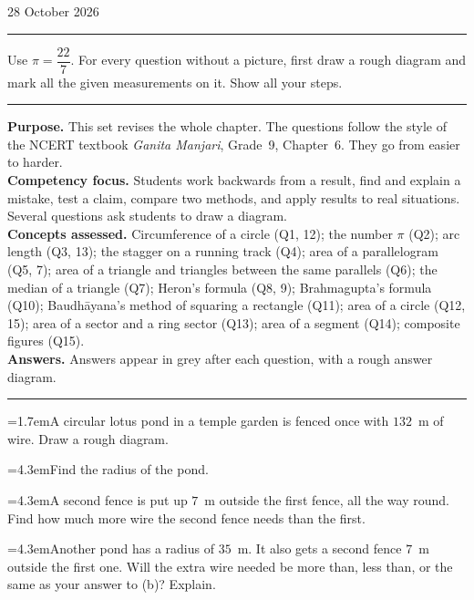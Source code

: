 \documentclass[11pt,a4paper]{article}
\newcommand{\nl}{\\[3pt]}
\newcounter{qn}
\newcommand{\ques}{\par\medskip\refstepcounter{qn}\noindent\hangindent=1.7em\hangafter=1\makebox[1.7em][l]{\textbf{\arabic{qn}.}}\ignorespaces}
\newcommand{\pc}[2]{\par\smallskip\noindent\hspace*{2em}\hangindent=4.3em\hangafter=1\makebox[2em][l]{(#1)}\hspace{0.3em}#2\par}
\begin{document}
\hfill 28 October 2026\par
\vspace{2pt}
\noindent\rule{\linewidth}{0.6pt}\par
\vspace{2pt}
{\small Use $\pi=\dfrac{22}{7}$. For every question without a picture, first draw a rough diagram and mark all the given measurements on it. Show all your steps.\par}
\ifteacher
\vspace{4pt}
{\color{thinrule}\noindent\rule{\linewidth}{0.4pt}}\par
\vspace{4pt}
{\small\color{muted}\linespread{1.15}\selectfont
\textbf{Purpose.} This set revises the whole chapter. The questions follow the style of the NCERT textbook \textit{Ganita Manjari}, Grade~9, Chapter~6. They go from easier to harder.\nl
\textbf{Competency focus.} Students work backwards from a result, find and explain a mistake, test a claim, compare two methods, and apply results to real situations. Several questions ask students to draw a diagram.\nl
\textbf{Concepts assessed.} Circumference of a circle (Q1, 12); the number $\pi$ (Q2); arc length (Q3, 13); the stagger on a running track (Q4); area of a parallelogram (Q5, 7); area of a triangle and triangles between the same parallels (Q6); the median of a triangle (Q7); Heron's formula (Q8, 9); Brahmagupta's formula (Q10); Baudh\={a}yana's method of squaring a rectangle (Q11); area of a circle (Q12, 15); area of a sector and a ring sector (Q13); area of a segment (Q14); composite figures (Q15).\nl
\textbf{Answers.} Answers appear in grey after each question, with a rough answer diagram.\par}
\vspace{4pt}
{\color{thinrule}\noindent\rule{\linewidth}{0.4pt}}\par
\vspace{3pt}
\fi
{}
\ques A circular lotus pond in a temple garden is fenced once with $132$~m of wire. Draw a rough diagram.\par
\pc{a}{Find the radius of the pond.}
\pc{b}{A second fence is put up $7$~m outside the first fence, all the way round. Find how much more wire the second fence needs than the first.}
\pc{c}{Another pond has a radius of $35$~m. It also gets a second fence $7$~m outside the first one. Will the extra wire needed be more than, less than, or the same as your answer to (b)? Explain.}
\end{document}
